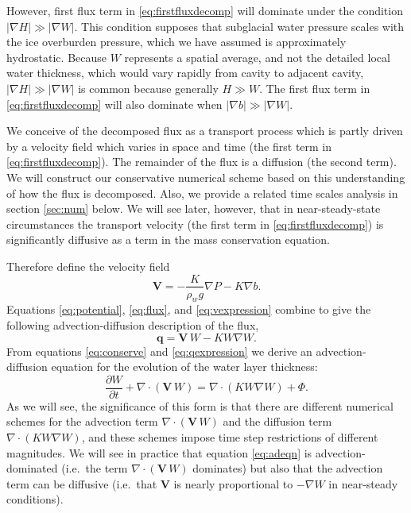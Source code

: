 \documentclass[11pt,final]{amsart}%
\newcommand\bV{\mathbf{V}}
\newcommand\bq{\mathbf{q}}
\newcommand{\Div}{\nabla\cdot}
\newcommand{\grad}{\nabla}
\begin{document}
However, first flux term in \eqref{eq:firstfluxdecomp} will dominate under the condition $|\grad H| \gg |\grad W|$.  This condition supposes that subglacial water pressure scales with the ice overburden pressure, which we have assumed is approximately hydrostatic.  Because $W$ represents a spatial average, and not the detailed local water thickness, which would vary rapidly from cavity to adjacent cavity, $|\grad H| \gg |\grad W|$ is common because generally $H\gg W$.  The first flux term in \eqref{eq:firstfluxdecomp} will also dominate when $|\grad b| \gg |\grad W|$. 

We conceive of the decomposed flux as a transport process which is partly driven by a velocity field which varies in space and time (the first term in \eqref{eq:firstfluxdecomp}).  The remainder of the flux is a diffusion (the second term).  We will construct our conservative numerical scheme based on this understanding of how the flux is decomposed.  Also, we provide a related time scales analysis in section \ref{sec:num} below.  We will see later, however, that in near-steady-state circumstances the transport velocity (the first term in \eqref{eq:firstfluxdecomp}) is significantly diffusive as a term in the mass conservation equation.

Therefore define the velocity field
\begin{equation} \label{eq:vexpression}
  \bV = - \frac{K}{\rho_w g} \grad P - K \grad b.
\end{equation}
Equations \eqref{eq:potential}, \eqref{eq:flux}, and \eqref{eq:vexpression} combine to give the following advection-diffusion description of the flux,
\begin{equation} \label{eq:qexpression}
  \bq = \bV\, W - K W \grad W.
\end{equation}
From equations \eqref{eq:conserve} and \eqref{eq:qexpression} we derive an advection-diffusion equation \citep{HundsdorferVerwer2010} for the evolution of the water layer thickness:
\begin{equation} \label{eq:adeqn}
  \frac{\partial W}{\partial t} + \Div\left(\bV\, W\right) = \Div \left(K W \grad W\right) + \Phi.
\end{equation}
As we will see, the significance of this form is that there are different numerical schemes for the advection term $\Div\left(\bV\, W\right)$ and the diffusion term $\Div \left(K W \grad W\right)$, and these schemes impose time step restrictions of different magnitudes.  We will see in practice that equation \eqref{eq:adeqn} is advection-dominated (i.e.~the term $\Div\left(\bV\, W\right)$ dominates) but also that the advection term can be diffusive (i.e.~that $\bV$ is nearly proportional to $-\grad W$ in near-steady conditions).
\end{document}
